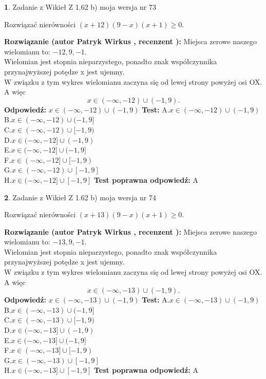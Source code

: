 \documentclass[12pt, a4paper]{article}
\theoremstyle{definition} %
\newtheorem{zad}{}
\newcommand{\zadStart}[1]{\begin{zad}#1\newline}
\newcommand{\zadStop}{\end{zad}}
\newcommand{\rozwStart}[2]{\noindent \textbf{Rozwiązanie (autor #1 , recenzent #2): }\newline}
\newcommand{\rozwStop}{\newline}
\newcommand{\odpStart}{\noindent \textbf{Odpowiedź:}\newline}
\newcommand{\odpStop}{\newline}
\newcommand{\testStart}{\noindent \textbf{Test:}\newline}
\newcommand{\testStop}{\newline}
\newcommand{\kluczStart}{\noindent \textbf{Test poprawna odpowiedź:}\newline}
\newcommand{\kluczStop}{\newline}
\begin{document}
\zadStart{Zadanie z Wikieł Z 1.62 b) moja wersja nr 73}

Rozwiązać nierówności $(x+12)(9-x)(x+1)\ge0$.
\zadStop
\rozwStart{Patryk Wirkus}{}
Miejsca zerowe naszego wielomianu to: $-12, 9, -1$.\\
Wielomian jest stopnia nieparzystego, ponadto znak współczynnika przy\linebreak najwyższej potędze x jest ujemny.\\ W związku z tym wykres wielomianu zaczyna się od lewej strony powyżej osi OX. A więc $$x \in (-\infty,-12) \cup (-1,9).$$
\rozwStop
\odpStart
$x \in (-\infty,-12) \cup (-1,9)$
\odpStop
\testStart
A.$x \in (-\infty,-12) \cup (-1,9)$\\
B.$x \in (-\infty,-12) \cup (-1,9]$\\
C.$x \in (-\infty,-12) \cup [-1,9)$\\
D.$x \in (-\infty,-12] \cup (-1,9)$\\
E.$x \in (-\infty,-12] \cup (-1,9]$\\
F.$x \in (-\infty,-12] \cup [-1,9)$\\
G.$x \in (-\infty,-12) \cup [-1,9]$\\
H.$x \in (-\infty,-12] \cup [-1,9]$
\testStop
\kluczStart
A
\kluczStop



\zadStart{Zadanie z Wikieł Z 1.62 b) moja wersja nr 74}

Rozwiązać nierówności $(x+13)(9-x)(x+1)\ge0$.
\zadStop
\rozwStart{Patryk Wirkus}{}
Miejsca zerowe naszego wielomianu to: $-13, 9, -1$.\\
Wielomian jest stopnia nieparzystego, ponadto znak współczynnika przy\linebreak najwyższej potędze x jest ujemny.\\ W związku z tym wykres wielomianu zaczyna się od lewej strony powyżej osi OX. A więc $$x \in (-\infty,-13) \cup (-1,9).$$
\rozwStop
\odpStart
$x \in (-\infty,-13) \cup (-1,9)$
\odpStop
\testStart
A.$x \in (-\infty,-13) \cup (-1,9)$\\
B.$x \in (-\infty,-13) \cup (-1,9]$\\
C.$x \in (-\infty,-13) \cup [-1,9)$\\
D.$x \in (-\infty,-13] \cup (-1,9)$\\
E.$x \in (-\infty,-13] \cup (-1,9]$\\
F.$x \in (-\infty,-13] \cup [-1,9)$\\
G.$x \in (-\infty,-13) \cup [-1,9]$\\
H.$x \in (-\infty,-13] \cup [-1,9]$
\testStop
\kluczStart
A
\kluczStop
\end{document}
